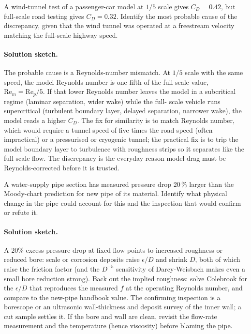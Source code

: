 \begin{exercise}
A wind-tunnel test of a passenger-car model at $1/5$ scale gives
$C_D = 0.42$, but full-scale road testing gives $C_D = 0.32$.
Identify the most probable cause of the discrepancy, given that
the wind tunnel was operated at a freestream velocity matching
the full-scale highway speed.

\paragraph{Solution sketch.} The probable cause is a Reynolds-number
mismatch. At $1/5$ scale with the same speed, the model Reynolds
number is one-fifth of the full-scale value, $\text{Re}_m =
\text{Re}_p/5$. If that lower Reynolds number leaves the model in a
subcritical regime (laminar separation, wider wake) while the full-
scale vehicle runs supercritical (turbulent boundary layer, delayed
separation, narrower wake), the model reads a higher $C_D$. The fix
for similarity is to match Reynolds number, which would require a
tunnel speed of five times the road speed (often impractical) or a
pressurised or cryogenic tunnel; the practical fix is to trip the
model boundary layer to turbulence with roughness strips so it
separates like the full-scale flow. The discrepancy is the everyday
reason model drag must be Reynolds-corrected before it is trusted.
\end{exercise}

\begin{exercise}
A water-supply pipe section has measured pressure drop $20\,\%$
larger than the Moody-chart prediction for new pipe of its
material. Identify what physical change in the pipe could account
for this and the inspection that would confirm or refute it.

\paragraph{Solution sketch.} A $20\%$ excess pressure drop at fixed
flow points to increased roughness or reduced bore: scale or
corrosion deposits raise $\epsilon/D$ and shrink $D$, both of which
raise the friction factor (and the $D^{-5}$ sensitivity of
Darcy-Weisbach makes even a small bore reduction strong). Back out the
implied roughness: solve Colebrook for the $\epsilon/D$ that
reproduces the measured $f$ at the operating Reynolds number, and
compare to the new-pipe handbook value. The confirming inspection is
a borescope or an ultrasonic wall-thickness and deposit survey of the
inner wall; a cut sample settles it. If the bore and wall are clean,
revisit the flow-rate measurement and the temperature (hence
viscosity) before blaming the pipe.
\end{exercise}

